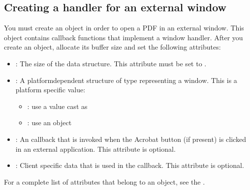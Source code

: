 \documentclass[letterpaper,12pt,english,openany,oneside]{sphinxmanual}
\begin{document}
\subsection{Creating a handler for an external window}
\label{\detokenize{Plugins_Documents:creating-a-handler-for-an-external-window}}
You must create an  object in order to open a PDF in an external window. This object contains callback functions that implement a window handler. After you create an  object, allocate its buffer size and set the following attributes:
\begin{itemize}
\item {} 
: The size of the data structure. This attribute must be set to .

\item {} 
: A platform\sphinxhyphen{}dependent structure of type  representing a window. This is a platform specific value:
\begin{itemize}
\item {} 
: use a  value cast as 

\item {} 
: use an  object

\end{itemize}

\item {} 
: An  callback that is invoked when the Acrobat button (if present) is clicked in an external application. This attribute is optional.

\item {} 
: Client specific data that is used in the  callback. This attribute is optional.

\end{itemize}

For a complete list of attributes that belong to an  object, see the .
\end{document}
